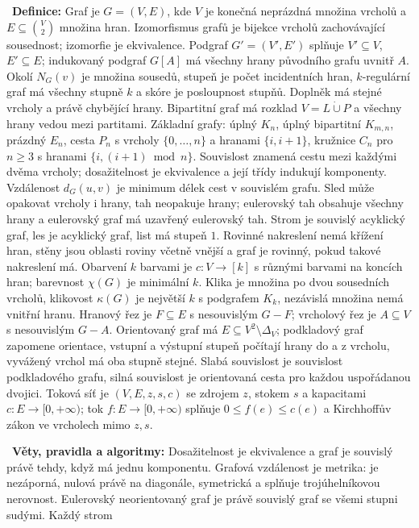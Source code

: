 \begin{odpoved}
\setlength{\parskip}{2pt}
\noindent{}\ \textbf{Definice:} Graf je $G=(V,E)$, kde $V$ je konečná neprázdná
množina vrcholů a $E\subseteq\binom V2$ množina hran. Izomorfismus grafů je bijekce
vrcholů zachovávající sousednost; izomorfie je ekvivalence. Podgraf $G'=(V',E')$
splňuje $V'\subseteq V$, $E'\subseteq E$; indukovaný podgraf $G[A]$ má všechny hrany
původního grafu uvnitř $A$. Okolí $N_G(v)$ je množina sousedů, stupeň je počet incidentních
hran, $k$-regulární graf má všechny stupně $k$ a skóre je posloupnost stupňů. Doplněk
má stejné vrcholy a právě chybějící hrany. Bipartitní graf má rozklad $V=L\dot\cup P$
a všechny hrany vedou mezi partitami. Základní grafy: úplný $K_n$, úplný bipartitní
$K_{m,n}$, prázdný $E_n$, cesta $P_n$ s vrcholy $\{0,\ldots,n\}$ a hranami
$\{i,i+1\}$, kružnice $C_n$ pro $n\ge3$ s hranami $\{i,(i+1)\bmod n\}$. Souvislost
znamená cestu mezi každými dvěma vrcholy; dosažitelnost je ekvivalence a její třídy
indukují komponenty. Vzdálenost $d_G(u,v)$ je minimum délek cest v souvislém grafu.
Sled může opakovat vrcholy i hrany, tah neopakuje hrany; eulerovský tah obsahuje všechny
hrany a eulerovský graf má uzavřený eulerovský tah. Strom je souvislý acyklický graf,
les je acyklický graf, list má stupeň $1$. Rovinné nakreslení nemá křížení hran,
stěny jsou oblasti roviny včetně vnější a graf je rovinný, pokud takové nakreslení má.
Obarvení $k$ barvami je $c:V\to[k]$ s různými barvami na koncích hran; barevnost
$\chi(G)$ je minimální $k$. Klika je množina po dvou sousedních vrcholů, klikovost
$\kappa(G)$ je největší $k$ s podgrafem $K_k$, nezávislá množina nemá vnitřní hranu.
Hranový řez je $F\subseteq E$ s nesouvislým $G-F$; vrcholový řez je $A\subseteq V$
s nesouvislým $G-A$. Orientovaný graf má $E\subseteq V^2\setminus\Delta_V$; podkladový
graf zapomene orientace, vstupní a výstupní stupeň počítají hrany do a z vrcholu,
vyvážený vrchol má oba stupně stejné. Slabá souvislost je souvislost podkladového grafu,
silná souvislost je orientovaná cesta pro každou uspořádanou dvojici. Toková síť je
$(V,E,z,s,c)$ se zdrojem $z$, stokem $s$ a kapacitami $c:E\to[0,+\infty)$; tok
$f:E\to[0,+\infty)$ splňuje $0\le f(e)\le c(e)$ a Kirchhoffův zákon ve vrcholech mimo
$z,s$.\par
\noindent{}\ \textbf{Věty, pravidla a algoritmy:} Dosažitelnost je ekvivalence a
graf je souvislý právě tehdy, když má jednu komponentu. Grafová vzdálenost je metrika:
je nezáporná, nulová právě na diagonále, symetrická a splňuje trojúhelníkovou nerovnost.
Eulerovský neorientovaný graf je právě souvislý graf se všemi stupni sudými. Každý strom

\end{odpoved}
